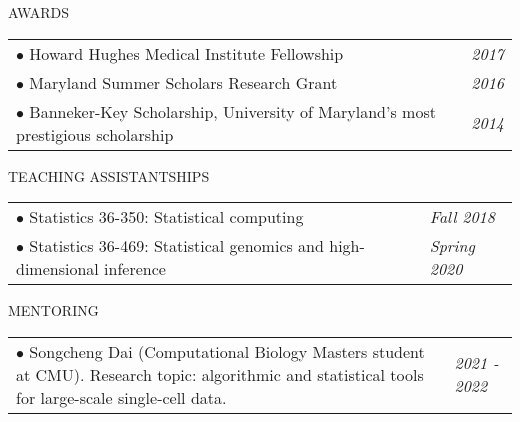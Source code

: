\documentclass{resume} %
\begin{document}


\begin{rSection}{AWARDS}


\begin{tabular}{p{14cm}R{2.5cm}}
$\bullet$ Howard Hughes Medical Institute Fellowship  &  \it{2017}  \\ 
$\bullet$ Maryland Summer Scholars Research Grant  & \it{2016}  \\ 
$\bullet$ Banneker-Key Scholarship, University of Maryland's most prestigious scholarship & \it{2014}
\end{tabular} 


\end{rSection}



\begin{rSection}{TEACHING ASSISTANTSHIPS}
\begin{tabular}{p{14cm}R{2.5cm}}
	$\bullet$ Statistics 36-350: Statistical computing 
	& \textit{Fall 2018} \\ 
	$\bullet$ Statistics 36-469: Statistical genomics and high-dimensional inference & \textit{Spring 2020}
\end{tabular} 
\end{rSection}

\begin{rSection}{MENTORING}
	\begin{tabular}{p{14cm}R{2.5cm}}
		$\bullet$ Songcheng Dai (Computational Biology Masters student at CMU). Research topic: algorithmic and statistical tools for large-scale single-cell data.
		& \textit{2021 - 2022} \\ 
	\end{tabular} 
\end{rSection}
\end{document}
